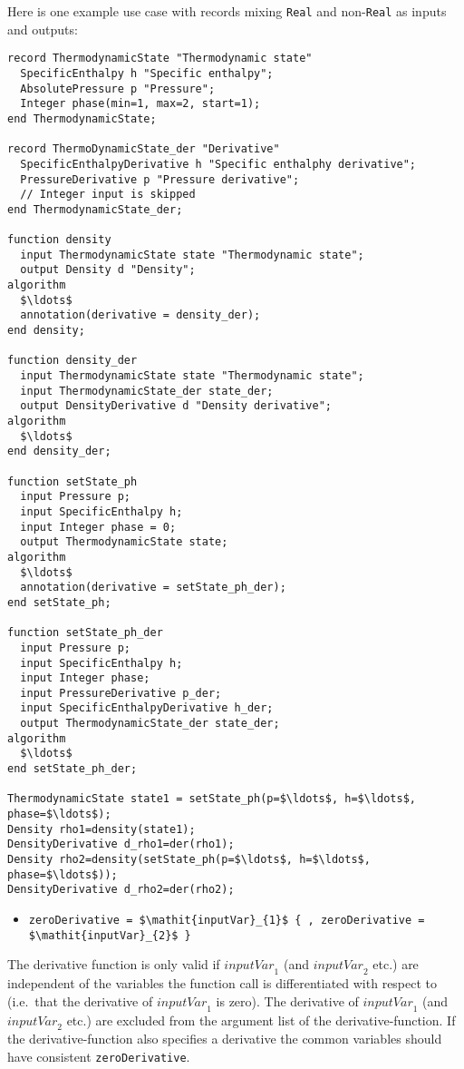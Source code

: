 \begin{example}
Here is one example use case with records mixing \lstinline!Real! and
non-\lstinline!Real! as inputs and outputs:
\begin{lstlisting}[language=modelica]
record ThermodynamicState "Thermodynamic state"
  SpecificEnthalpy h "Specific enthalpy";
  AbsolutePressure p "Pressure";
  Integer phase(min=1, max=2, start=1);
end ThermodynamicState;

record ThermoDynamicState_der "Derivative"
  SpecificEnthalpyDerivative h "Specific enthalphy derivative";
  PressureDerivative p "Pressure derivative";
  // Integer input is skipped
end ThermodynamicState_der;

function density
  input ThermodynamicState state "Thermodynamic state";
  output Density d "Density";
algorithm
  $\ldots$
  annotation(derivative = density_der);
end density;

function density_der
  input ThermodynamicState state "Thermodynamic state";
  input ThermodynamicState_der state_der;
  output DensityDerivative d "Density derivative";
algorithm
  $\ldots$
end density_der;

function setState_ph
  input Pressure p;
  input SpecificEnthalpy h;
  input Integer phase = 0;
  output ThermodynamicState state;
algorithm
  $\ldots$
  annotation(derivative = setState_ph_der);
end setState_ph;

function setState_ph_der
  input Pressure p;
  input SpecificEnthalpy h;
  input Integer phase;
  input PressureDerivative p_der;
  input SpecificEnthalpyDerivative h_der;
  output ThermodynamicState_der state_der;
algorithm
  $\ldots$
end setState_ph_der;

ThermodynamicState state1 = setState_ph(p=$\ldots$, h=$\ldots$, phase=$\ldots$);
Density rho1=density(state1);
DensityDerivative d_rho1=der(rho1);
Density rho2=density(setState_ph(p=$\ldots$, h=$\ldots$, phase=$\ldots$));
DensityDerivative d_rho2=der(rho2);
\end{lstlisting}
\end{example}

\begin{itemize}
\item
  \lstinline[language=grammar]!zeroDerivative = $\mathit{inputVar}_{1}$ { , zeroDerivative = $\mathit{inputVar}_{2}$ }!
\end{itemize}

The derivative function is only valid if $\mathit{inputVar}_{1}$ (and $\mathit{inputVar}_{2}$ etc.) are independent of the variables the function call is differentiated with respect to (i.e.\ that the derivative of $\mathit{inputVar}_{1}$ is zero).
The derivative of $\mathit{inputVar}_{1}$ (and $\mathit{inputVar}_{2}$ etc.) are excluded from the argument list of the derivative-function.
If the derivative-function also specifies a derivative the common variables should have consistent \lstinline!zeroDerivative!.

